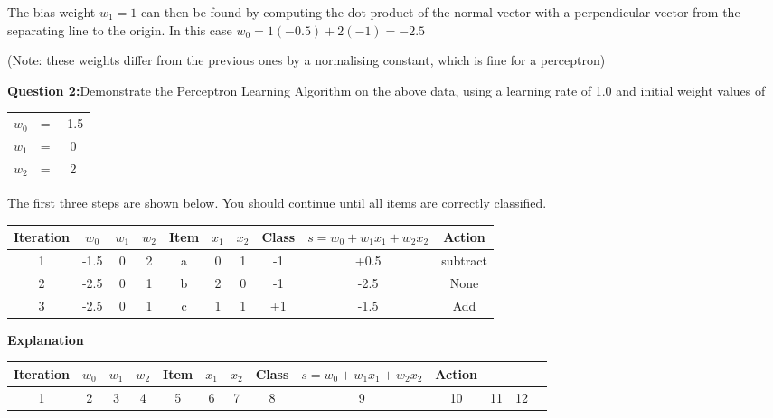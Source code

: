 \documentclass[11pt]{article}
\begin{document}
The bias weight \(w_1=1\) can then be found by computing the dot product of the normal vector with a perpendicular vector from the separating line to the origin.
In this case \(w_0 = 1(-0.5) + 2(-1) = -2.5\)

(Note: these weights differ from the previous ones by a normalising constant, which is fine for a perceptron)

\pagebreak

\textbf{Question 2:}Demonstrate the Perceptron Learning Algorithm on the above data, using a learning rate of 1.0 and initial weight values of
\begin{center}
\begin{tabular}{ c c c }
    \(w_0\) & = & -1.5 \\
    \(w_1\) & = & 0 \\
    \(w_2\) & = & 2
\end{tabular}
\end{center}

The first three steps are shown below.
You should continue until all items are correctly classified.

\begin{center}
\begin{tabular}{ |c|c|c|c|c|c|c|c|c|c| }
    \hline
    Iteration & \(w_0\) & \(w_1\) & \(w_2\) & Item & \(x_1\) & \(x_2\) & Class & \(s = w_0 + w_1 x_1 + w_2 x_2\) & Action \\
    \hline
    1 & -1.5 & 0 & 2 & a & 0 & 1 & -1 & +0.5 & subtract \\
    2 & -2.5 & 0 & 1 & b & 2 & 0 & -1 & -2.5 & None \\
    3 & -2.5 & 0 & 1 & c & 1 & 1 & +1 & -1.5 & Add \\
    \hline
\end{tabular}
\end{center}

\textbf{Explanation}
\begin{center}
\begin{tabular}{ |c|c|c|c|c|c|c|c|c|c| }
    \hline
    Iteration & \(w_0\) & \(w_1\) & \(w_2\) & Item & \(x_1\) & \(x_2\) & Class & \(s = w_0 + w_1 x_1 + w_2 x_2\) & Action \\
     &
    2 &
    3 &
    4 &
    5 &
    6 &
    7 &
    8 &
    9 &
    10 &
    11 &
    12 &
    \hline
\end{tabular}
\end{center}
\end{document}
